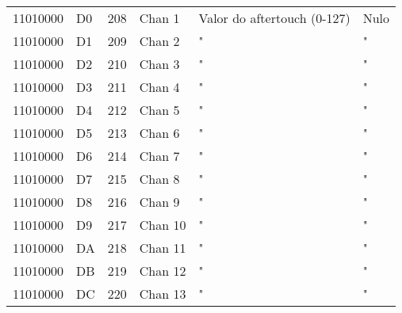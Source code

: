 \begin{center}
\begin{supertabular}{| C{2cm} | C{1.5cm} | C{1.5cm} | C{5.3cm} | C{1.5cm} | C{1.5cm} |}
             11010000 & D0 & 208 & Chan 1   &              Valor do aftertouch (0-127)          &                   Nulo                      \\
                11010000 & D1 & 209 & Chan 2   &                              "                    &                    "                        \\
             11010000 & D2 & 210 & Chan 3   &                              "                    &                    "                        \\
                11010000 & D3 & 211 & Chan 4   &                              "                    &                    "                        \\
             11010000 & D4 & 212 & Chan 5   &                              "                    &                    "                        \\
                11010000 & D5 & 213 & Chan 6   &                              "                    &                    "                        \\
             11010000 & D6 & 214 & Chan 7   &                              "                    &                    "                        \\
                11010000 & D7 & 215 & Chan 8   &                              "                    &                    "                        \\
             11010000 & D8 & 216 & Chan 9   &                              "                    &                    "                        \\
                11010000 & D9 & 217 & Chan 10  &                              "                    &                    "                        \\
             11010000 & DA & 218 & Chan 11  &                              "                    &                    "                        \\
                11010000 & DB & 219 & Chan 12  &                              "                    &                    "                        \\
             11010000 & DC & 220 & Chan 13  &                              "                    &                    "                        \\

\end{supertabular}
\end{center}
